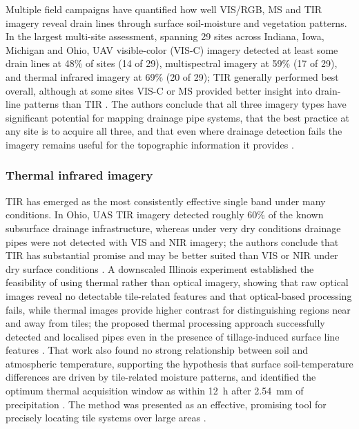 \documentclass[11pt]{article}
\begin{document}
Multiple field campaigns have quantified how well VIS/RGB, MS and TIR imagery reveal drain lines through surface soil-moisture and vegetation patterns. In the largest multi-site assessment, spanning 29 sites across Indiana, Iowa, Michigan and Ohio, UAV visible-color (VIS-C) imagery detected at least some drain lines at 48\% of sites (14 of 29), multispectral imagery at 59\% (17 of 29), and thermal infrared imagery at 69\% (20 of 29); TIR generally performed best overall, although at some sites VIS-C or MS provided better insight into drain-line patterns than TIR \parencite{Allred2020}. The authors conclude that all three imagery types have significant potential for mapping drainage pipe systems, that the best practice at any site is to acquire all three, and that even where drainage detection fails the imagery remains useful for the topographic information it provides \parencite{Allred2020}.

\subsubsection{Thermal infrared imagery}

TIR has emerged as the most consistently effective single band under many conditions. In Ohio, UAS TIR imagery detected roughly 60\% of the known subsurface drainage infrastructure, whereas under very dry conditions drainage pipes were not detected with VIS and NIR imagery; the authors conclude that TIR has substantial promise and may be better suited than VIS or NIR under dry surface conditions \parencite{Allred2018}. A downscaled Illinois experiment established the feasibility of using thermal rather than optical imagery, showing that raw optical images reveal no detectable tile-related features and that optical-based processing fails, while thermal images provide higher contrast for distinguishing regions near and away from tiles; the proposed thermal processing approach successfully detected and localised pipes even in the presence of tillage-induced surface line features \parencite{Woo2019}. That work also found no strong relationship between soil and atmospheric temperature, supporting the hypothesis that surface soil-temperature differences are driven by tile-related moisture patterns, and identified the optimum thermal acquisition window as within 12~h after 2.54~mm of precipitation \parencite{Woo2019}. The method was presented as an effective, promising tool for precisely locating tile systems over large areas \parencite{Woo2019}.
\end{document}
